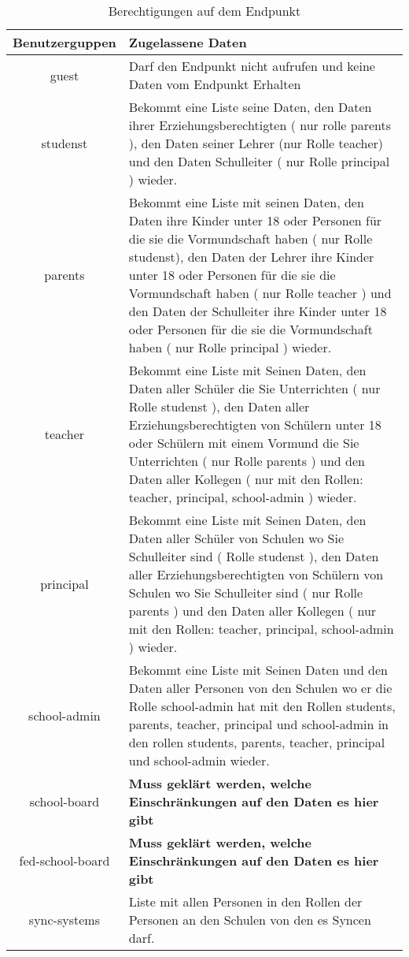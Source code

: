 \begin{table}[htb]
	\begin{tabularx}{\textwidth}{|c|X|}
		\hline
\textbf{Benutzerguppen} & \textbf{Zugelassene Daten} \\ \hline
guest & Darf den Endpunkt nicht aufrufen und keine Daten vom Endpunkt Erhalten \\ \hline
studenst & Bekommt eine Liste seine Daten, 
           den Daten ihrer Erziehungsberechtigten ( nur rolle parents ), 
					 den Daten seiner Lehrer (nur Rolle teacher) und 
					 den Daten Schulleiter ( nur Rolle principal ) wieder.\\ \hline
parents & Bekommt eine Liste mit seinen Daten, 
          den Daten ihre Kinder unter 18 oder Personen für die sie die Vormundschaft haben ( nur Rolle studenst), 
					den Daten der Lehrer ihre Kinder unter 18 oder Personen für die sie die Vormundschaft haben ( nur Rolle teacher ) und
					den Daten der Schulleiter ihre Kinder unter 18 oder Personen für die sie die Vormundschaft haben ( nur Rolle principal )
					wieder.\\ \hline
teacher & Bekommt eine Liste mit Seinen Daten, 
          den Daten aller Schüler die Sie Unterrichten ( nur Rolle studenst ),
					den Daten aller Erziehungsberechtigten von Schülern unter 18 oder Schülern  mit einem Vormund die Sie Unterrichten ( nur Rolle parents ) und
					den Daten aller Kollegen ( nur mit den Rollen: teacher, principal, school-admin ) 
					wieder.\\ \hline
principal & Bekommt eine Liste mit Seinen Daten,
            den Daten aller Schüler von Schulen wo Sie Schulleiter sind ( Rolle studenst ),
						den Daten aller Erziehungsberechtigten von Schülern von Schulen wo Sie Schulleiter sind ( nur Rolle parents ) und
					  den Daten aller Kollegen ( nur mit den Rollen: teacher, principal, school-admin )
						wieder.\\ \hline
school-admin & Bekommt eine Liste mit Seinen Daten und
               den Daten aller Personen von den Schulen wo er die Rolle school-admin hat mit den Rollen students, parents, teacher, principal und school-admin in den rollen students, parents, teacher, principal und school-admin wieder.  \\ \hline
school-board & \textcolor[rgb]{1,0.41,0.13}{\textbf{Muss geklärt werden, welche Einschränkungen auf den Daten es hier gibt}} \\ \hline
fed-school-board & \textcolor[rgb]{1,0.41,0.13}{\textbf{Muss geklärt werden, welche Einschränkungen auf den Daten es hier gibt}} \\ \hline
sync-systems & Liste mit allen Personen in den Rollen der Personen an den Schulen von den es Syncen darf. \\ \hline

	\end{tabularx}

		\caption{Berechtigungen auf dem Endpunkt}
		\label{tab:end:rest:api:school:users:get:right}
\end{table}